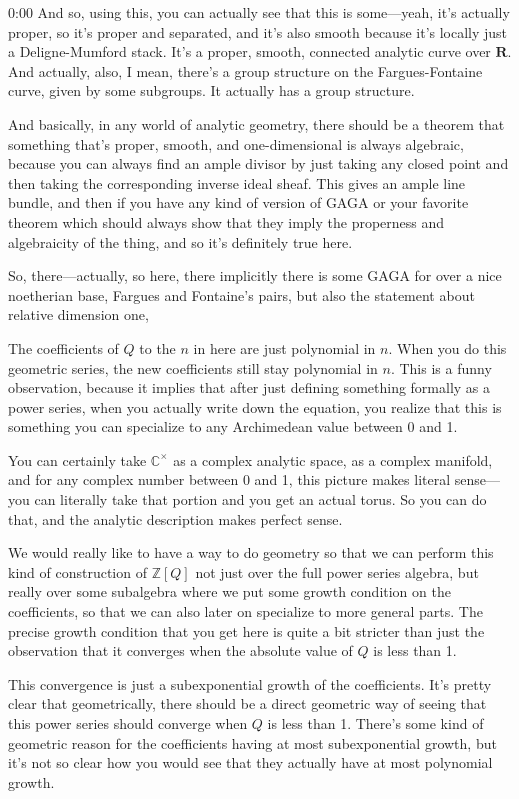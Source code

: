 \begin{unfinished}{0:00}
And so, using this, you can actually see that this is some---yeah, it's actually proper, so it's proper and separated, and it's also smooth because it's locally just a Deligne-Mumford stack. It's a proper, smooth, connected analytic curve over $\mathbf{R}$. And actually, also, I mean, there's a group structure on the Fargues-Fontaine curve, given by some subgroups. It actually has a group structure.

And basically, in any world of analytic geometry, there should be a theorem that something that's proper, smooth, and one-dimensional is always algebraic, because you can always find an ample divisor by just taking any closed point and then taking the corresponding inverse ideal sheaf. This gives an ample line bundle, and then if you have any kind of version of GAGA or your favorite theorem which should always show that they imply the properness and algebraicity of the thing, and so it's definitely true here.

So, there---actually, so here, there implicitly there is some GAGA for over a nice noetherian base, Fargues and Fontaine's pairs, but also the statement about relative dimension one,

The coefficients of $Q$ to the $n$ in here are just polynomial in $n$. When you do this geometric series, the new coefficients still stay polynomial in $n$. This is a funny observation, because it implies that after just defining something formally as a power series, when you actually write down the equation, you realize that this is something you can specialize to any Archimedean value between 0 and 1.

You can certainly take $\mathbb{C}^\times$ as a complex analytic space, as a complex manifold, and for any complex number between 0 and 1, this picture makes literal sense---you can literally take that portion and you get an actual torus. So you can do that, and the analytic description makes perfect sense.

We would really like to have a way to do geometry so that we can perform this kind of construction of $\mathbb{Z}[Q]$ not just over the full power series algebra, but really over some subalgebra where we put some growth condition on the coefficients, so that we can also later on specialize to more general parts. The precise growth condition that you get here is quite a bit stricter than just the observation that it converges when the absolute value of $Q$ is less than 1.

This convergence is just a subexponential growth of the coefficients. It's pretty clear that geometrically, there should be a direct geometric way of seeing that this power series should converge when $Q$ is less than 1. There's some kind of geometric reason for the coefficients having at most subexponential growth, but it's not so clear how you would see that they actually have at most polynomial growth.


\end{unfinished}
